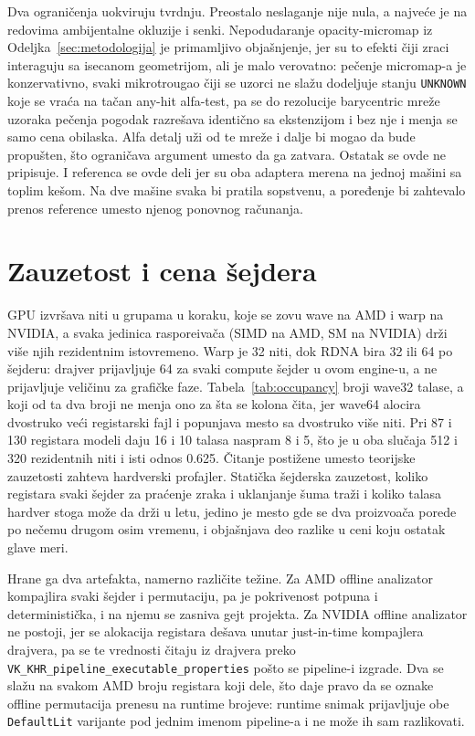 Dva ograni\v{c}enja uokviruju tvrdnju. Preostalo neslaganje nije nula, a najve\'ce je na
redovima ambijentalne okluzije i senki. Nepodudaranje opacity-micromap iz
Odeljka~\ref{sec:metodologija} je primamljivo obja\v{s}njenje, jer su to efekti \v{c}iji zraci
interaguju sa isecanom geometrijom, ali je malo verovatno: pe\v{c}enje micromap-a je konzervativno,
svaki mikrotrougao \v{c}iji se uzorci ne sla\v{z}u dodeljuje stanju \texttt{UNKNOWN} koje se vra\'ca na
ta\v{c}an any-hit alfa-test, pa se do rezolucije barycentric mre\v{z}e uzoraka pe\v{c}enja pogodak
razre\v{s}ava identi\v{c}no sa ekstenzijom i bez nje i menja se samo cena obilaska. Alfa
detalj u\v{z}i od te mre\v{z}e i dalje bi mogao da bude propu\v{s}ten, \v{s}to ograni\v{c}ava argument umesto da ga zatvara.
Ostatak se ovde ne pripisuje.
I referenca se ovde deli jer su oba adaptera merena na jednoj ma\v{s}ini sa toplim ke\v{s}om.
Na dve ma\v{s}ine svaka bi pratila sopstvenu, a poređenje bi zahtevalo prenos reference
umesto njenog ponovnog ra\v{c}unanja.

\section{Zauzetost i cena \v{s}ejdera}
\label{sec:occupancy}

GPU izvr\v{s}ava niti u grupama u koraku, koje se zovu wave na AMD i warp na NVIDIA, a svaka jedinica raspore\dj{}iva\v{c}a
(SIMD na AMD, SM na NVIDIA) dr\v{z}i vi\v{s}e njih rezidentnim istovremeno. Warp je 32 niti, dok
RDNA bira 32 ili 64 po \v{s}ejderu: drajver prijavljuje 64 za svaki compute \v{s}ejder u ovom engine-u, a
ne prijavljuje veli\v{c}inu za grafi\v{c}ke faze. Tabela~\ref{tab:occupancy} broji wave32 talase, a
koji od ta dva broji ne menja ono za \v{s}ta se kolona \v{c}ita, jer wave64 alocira
dvostruko ve\'ci registarski fajl i popunjava mesto sa dvostruko vi\v{s}e niti. Pri 87 i 130 registara
modeli daju 16 i 10 talasa naspram 8 i 5, \v{s}to je u oba slu\v{c}aja 512 i 320 rezidentnih niti i isti
odnos 0.625. \v{C}itanje posti\v{z}ene umesto teorijske zauzetosti zahteva hardverski profajler. Stati\v{c}ka \v{s}ejderska
zauzetost, koliko registara svaki \v{s}ejder za pra\'cenje zraka i uklanjanje \v{s}uma tra\v{z}i i koliko
talasa hardver stoga mo\v{z}e da dr\v{z}i u letu, jedino je mesto gde se dva proizvo\dj a\v{c}a porede po
ne\v{c}emu drugom osim vremenu, i obja\v{s}njava deo razlike u ceni koju ostatak glave
meri.

Hrane ga dva artefakta, namerno razli\v{c}ite te\v{z}ine. Za AMD offline analizator kompajlira
svaki \v{s}ejder i permutaciju, pa je pokrivenost potpuna i deterministi\v{c}ka, i na njemu se zasniva
gejt projekta. Za NVIDIA offline analizator ne postoji, jer se alokacija registara de\v{s}ava unutar
just-in-time kompajlera drajvera, pa se te vrednosti \v{c}itaju iz drajvera preko
\texttt{VK\_KHR\_pipeline\_executable\_properties} pošto se pipeline-i izgrade. Dva se sla\v{z}u na
svakom AMD broju registara koji dele, \v{s}to daje pravo da se oznake offline permutacija prenesu
na runtime brojeve: runtime snimak prijavljuje obe \texttt{DefaultLit} varijante pod jednim
imenom pipeline-a i ne mo\v{z}e ih sam razlikovati.

